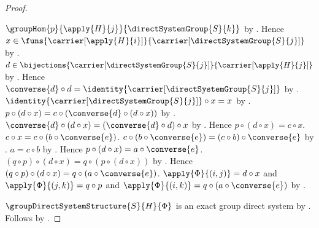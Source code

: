 \begin{proof}
\begin{subproof}
            $\groupHom{p}{\apply{H}{j}}
            {\directSystemGroup{S}{k}}$ by
            .
        Hence $x\in\funs{\carrier[\apply{H}{i}]}
            {\carrier[\directSystemGroup{S}{j}]}$ by
            .
        $d\in\bijections
            {\carrier[\directSystemGroup{S}{j}]}
            {\carrier[\apply{H}{j}]}$ by
            .
        Hence $\converse{d}\circ d
            =\identity{\carrier[\directSystemGroup{S}{j}]}$ by
            .
        $\identity{\carrier[\directSystemGroup{S}{j}]}\circ x=x$ by
            .
        $p\circ(d\circ x)=c\circ(\converse{d}\circ(d\circ x))$ by
            .
        $\converse{d}\circ(d\circ x)
            =(\converse{d}\circ d)\circ x$ by
            .
        Hence $p\circ(d\circ x)=c\circ x$.
        $c\circ x=c\circ(b\circ\converse{e})$.
        $c\circ(b\circ\converse{e})
            =(c\circ b)\circ\converse{e}$ by
            .
        $a=c\circ b$ by
            .
        Hence $p\circ(d\circ x)=a\circ\converse{e}$.
        $(q\circ p)\circ(d\circ x)
            =q\circ(p\circ(d\circ x))$ by
            .
        Hence $(q\circ p)\circ(d\circ x)
            =q\circ(a\circ\converse{e})$.
        $\apply{\Phi}{(i,j)}=d\circ x$ and
            $\apply{\Phi}{(j,k)}=q\circ p$ and
            $\apply{\Phi}{(i,k)}=q\circ(a\circ\converse{e})$ by
            .
    \end{subproof}
    $\groupDirectSystemStructure{S}{H}{\Phi}$ is an exact
        group direct system by
        .
    Follows by .
\end{proof}


